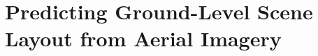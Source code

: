 \chapter{Predicting Ground-Level Scene Layout from Aerial Imagery}
\label{chap:crosstransf}


\copyrightnotice 
